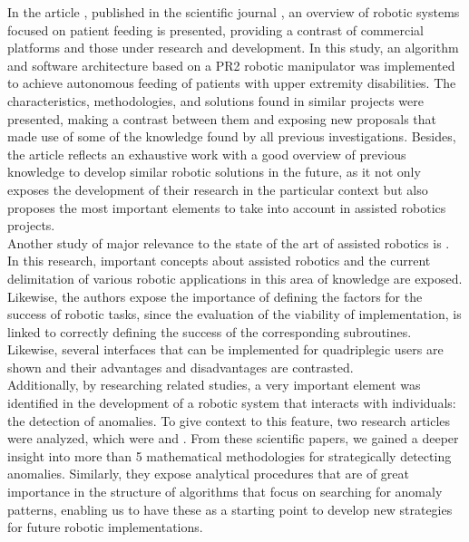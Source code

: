 \documentclass[11pt]{report} %
\begin{document}
In the article  \citep{cite_park_active_robot_assisted_feeding}, published in the scientific journal , an overview of robotic systems focused on patient feeding is presented, providing a contrast of commercial platforms and those under research and development. In this study, an algorithm and software architecture based on a PR2 robotic manipulator was implemented to achieve autonomous feeding of patients with upper extremity disabilities. The characteristics, methodologies, and solutions found in similar projects were presented, making a contrast between them and exposing new proposals that made use of some of the knowledge found by all previous investigations. Besides, the article reflects an exhaustive work with a good overview of previous knowledge to develop similar robotic solutions in the future, as it not only exposes the development of their research in the particular context but also proposes the most important elements to take into account in assisted robotics projects.\\

Another study of major relevance to the state of the art of assisted robotics is  \citep{cite_SAM_an_assisted_robotic_device_to_help_quadriplegia_persons}. In this research, important concepts about assisted robotics and the current delimitation of various robotic applications in this area of knowledge are exposed. Likewise, the authors expose the importance of defining the factors for the success of robotic tasks, since the evaluation of the viability of implementation, is linked to correctly defining the success of the corresponding subroutines. Likewise, several interfaces that can be implemented for quadriplegic users are shown and their advantages and disadvantages are contrasted.\\

Additionally, by researching related studies, a very important element was identified in the development of a robotic system that interacts with individuals: the detection of anomalies. To give context to this feature, two research articles were analyzed, which were  \citep{cite_multimodal_execution_monitor_with_anomaly_classification} and  \citep{cite_multimodal_anomaly_detector_for_robot_assisted_feeding_LSTM}. From these scientific papers, we gained a deeper insight into more than 5 mathematical methodologies for strategically detecting anomalies. Similarly, they expose analytical procedures that are of great importance in the structure of algorithms that focus on searching for anomaly patterns, enabling us to have these as a starting point to develop new strategies for future robotic implementations.\\
\end{document}
